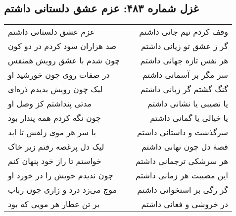 \begin{center}
\section*{غزل شماره ۴۸۳: عزم عشق دلستانی داشتم}
\label{sec:483}
\begin{longtable}{l p{0.5cm} r}
عزم عشق دلستانی داشتم
&&
وقف کردم نیم جانی داشتم
\\
صد هزاران سود کردم در دو کون
&&
گر ز عشق تو زیانی داشتم
\\
چون شدم با عشق رویش همنفس
&&
هر نفس تازه جهانی داشتم
\\
در صفات روی چون خورشید او
&&
سر مگر بر آسمانی داشتم
\\
لیک چون رویش بدیدم ذره‌ای
&&
گنگ گشتم گر زبانی داشتم
\\
مدتی پنداشتم کز وصل او
&&
یا نصیبی یا نشانی داشتم
\\
چون نگه کردم همه پندار بود
&&
یا خیالی یا گمانی داشتم
\\
با سر هر موی زلفش تا ابد
&&
سرگذشت و داستانی داشتم
\\
لیک دل پرغصه رفتم زیر خاک
&&
قصهٔ دل چون نهانی داشتم
\\
خواستم تا راز خود پنهان کنم
&&
هر سرشکی ترجمانی داشتم
\\
چون ندیدم خویش را در خورد او
&&
این مصیبت هر زمانی داشتم
\\
موج می‌زد درد و زاری چون رباب
&&
گر رگی بر استخوانی داشتم
\\
بر تن عطار هر مویی که بود
&&
در خروشی و فغانی داشتم
\\
\end{longtable}
\end{center}
